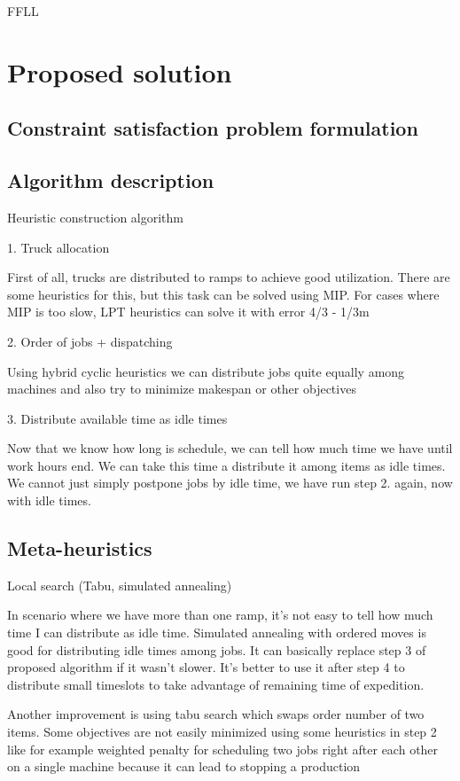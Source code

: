\documentclass{ctuthesis}
\begin{document}
FFLL 
\chapter{Proposed solution}
\label{ch:Proposed solution}
\section{Constraint satisfaction problem formulation}
\section{Algorithm description}
Heuristic construction algorithm

1. Truck allocation

First of all, trucks are distributed to ramps to achieve good utilization. There are some heuristics for this, but this task can be solved using MIP. For cases where MIP is too slow, LPT heuristics can solve it with error 4/3 - 1/3m 
\cite{gram1969}


2. Order of jobs + dispatching

Using hybrid cyclic heuristics we can distribute jobs quite equally among machines and also try to minimize makespan or other objectives

3. Distribute available time as idle times

Now that we know how long is schedule, we can tell how much time we have until work hours end. We can take this time a distribute it among items as idle times. We cannot just simply postpone jobs by idle time, we have run step 2. again, now with idle times.

\section{Meta-heuristics}
Local search (Tabu, simulated annealing)

In scenario where we have more than one ramp, it's not easy to tell how much time I can distribute as idle time. Simulated annealing with ordered moves is good for distributing idle times among jobs. It can basically replace step 3 of proposed algorithm if it wasn't slower. It's better to use it after step 4 to distribute small timeslots to take advantage of remaining time of expedition.

Another improvement is using tabu search which swaps order number of two items. Some objectives are not easily minimized using some heuristics in step 2 like for example weighted penalty for scheduling two jobs right after each other on a single machine because it can lead to stopping a production
\end{document}
